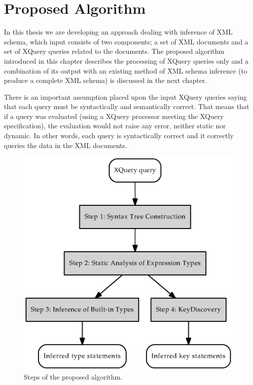 \chapter{Proposed Algorithm} \label{CHAPTER_proposed_algorithm}
In this thesis we are developing an approach dealing with inference of XML schema, which input consists of two components; a set of XML documents and a set of XQuery queries related to the documents. The proposed algorithm introduced in this chapter describes the processing of XQuery queries only and a combination of its output with an existing method of XML schema inference (to produce a complete XML schema) is discussed in the next chapter.

There is an important assumption placed upon the input XQuery queries saying that each query must be syntactically and semantically correct. That means that if a query was evaluated (using a XQuery processor meeting the XQuery specification), the evaluation would not raise any error, neither static nor dynamic. In other words, each query is syntactically correct and it correctly queries the data in the XML documents.

\begin{figure}
\label{FIG_steps_algorithm}
\caption{Steps of the proposed algorithm.}
\includegraphics[scale=1]{algorithm.eps}
\end{figure}

